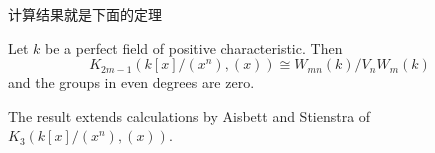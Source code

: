 计算结果就是下面的定理
\begin{theorem}
	Let $k$ be a perfect field of positive characteristic. Then
	\[K_{2m-1}(k[x]/(x^n), (x)) \cong W_{mn}(k)/V_nW_m(k)\]
and the groups in even degrees are zero.
\end{theorem}
The result extends calculations by Aisbett and Stienstra of $K_{3}(k[x]/(x^n), (x))$.








































